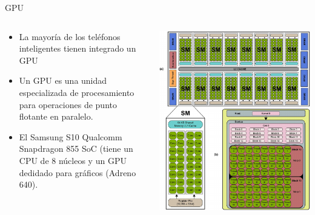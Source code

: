 \begin{frame}{GPU}
\begin{columns}
\begin{column}{0.70\textwidth}  
\begin{itemize}
\item La mayoría de los teléfonos inteligentes tienen integrado un GPU
\item Un GPU es una unidad especializada de procesamiento para operaciones de punto flotante en paralelo.
\item El Samsung S10 Qualcomm Snapdragon 855 SoC (tiene un CPU de 8 núcleos y un GPU dedidado para gráficos (Adreno 640).
\end{itemize}
\end{column}
\begin{column}{0.30\textwidth}  
    \begin{center}
     \includegraphics[width=\textwidth]{Figs/Typical-NVIDIA-GPU-architecture}
     \end{center}
\end{column}
\end{columns}
\end{frame}

